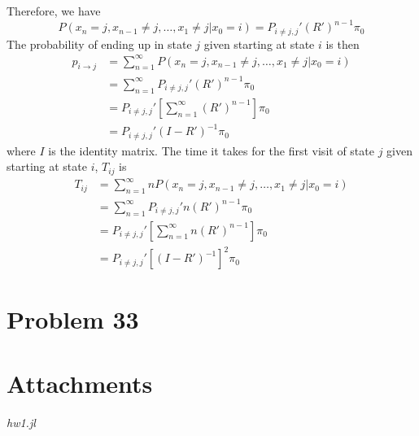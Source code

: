 \documentclass[a4paper, 11pt]{article}
\begin{document}
Therefore, we have 
\begin{equation}
P(x_n = j, x_{n-1} \neq j, \dots, x_1 \neq j | x_0 = i) = P_{i\neq j, j}' (R')^{n-1} \pi_0
\end{equation}
The probability of ending up in state $j$ given starting at state $i$ is then 
\begin{equation}
\begin{split}
p_{i\to j} & = \sum_{n=1}^{\infty} P(x_n = j, x_{n-1} \neq j, \dots, x_1 \neq j | x_0 = i)\\
 & = \sum_{n=1}^{\infty} P_{i\neq j, j}' (R')^{n-1} \pi_0 \\
 & = P_{i\neq j, j}' \left[ \sum_{n=1}^{\infty} (R')^{n-1} \right]\pi_0 \\
 & = P_{i\neq j, j}' (I - R')^{-1} \pi_0
\end{split}
\end{equation}
where $I$ is the identity matrix. The time it takes for the first visit of state $j$ given starting at state $i$, $T_{ij}$ is
\begin{equation}
\begin{split}
T_{ij} & = \sum_{n=1}^{\infty} n P(x_n = j, x_{n-1} \neq j, \dots, x_1 \neq j | x_0 = i)\\
 & = \sum_{n=1}^{\infty} P_{i\neq j, j}' n(R')^{n-1} \pi_0 \\
 & = P_{i\neq j, j}' \left[ \sum_{n=1}^{\infty} n(R')^{n-1} \right] \pi_0 \\
 & = P_{i\neq j, j}' \left[ (I - R')^{-1} \right]^2 \pi_0
\end{split}
\end{equation}


\section*{Problem 33}








\section*{Attachments}
	\textit{hw1.jl}

\end{document}

